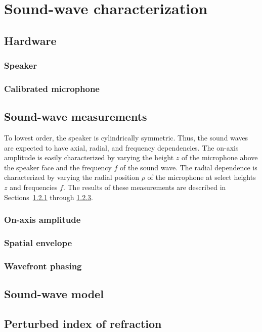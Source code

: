 \chapter{Sound-wave characterization}
\label{app:SoundWaveCharacterization}


\section{Hardware}
\label{sec:SoundWaveCharacterization:Hardware}
\subsection{Speaker}
\label{sec:SoundWaveCharacterization:Hardware:speaker}
\subsection{Calibrated microphone}
\label{sec:SoundWaveCharacterization:Hardware:microphone}


\section{Sound-wave measurements}
\label{sec:SoundWaveCharacterization:Measurements}
To lowest order, the speaker is cylindrically symmetric.
Thus, the sound waves are expected to have
axial, radial, and frequency dependencies.
The on-axis amplitude is easily characterized by varying
the height $z$ of the microphone above the speaker face and
the frequency $f$ of the sound wave.
The radial dependence is characterized by varying
the radial position $\rho$ of the microphone
at select heights $z$ and frequencies $f$.
The results of these measurements are described in
Sections~\ref{sec:SoundWaveCharacterization:Measurements:amlitude} through
\ref{sec:SoundWaveCharacterization:Measurements:phasing}.


\subsection{On-axis amplitude}
\label{sec:SoundWaveCharacterization:Measurements:amlitude}
\subsection{Spatial envelope}
\label{sec:SoundWaveCharacterization:Measurements:envelope}
\subsection{Wavefront phasing}
\label{sec:SoundWaveCharacterization:Measurements:phasing}


\section{Sound-wave model}
\label{sec:SoundWaveCharacterization:Model}


\section{Perturbed index of refraction}
\label{sec:SoundWaveCharacterization:PerturbedIndexOfRefractiion}




